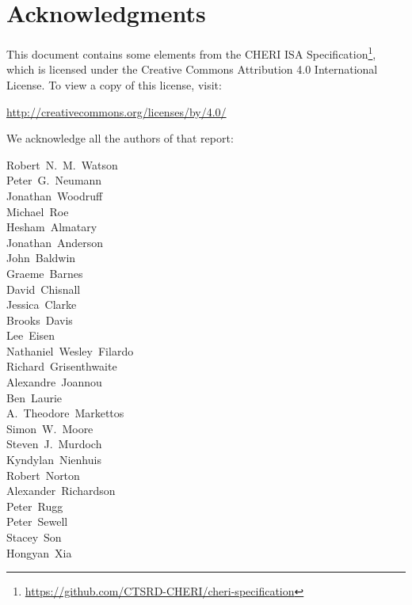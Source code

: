 \section*{Acknowledgments}

\vspace{-0.2cm}

\noindent
This document contains some elements from the CHERI ISA Specification\footnote{\url{https://github.com/CTSRD-CHERI/cheri-specification}},
which is licensed under the Creative Commons Attribution 4.0 International License. 
To view a copy of this license, visit:

\medskip

\url{http://creativecommons.org/licenses/by/4.0/}

\medskip
\noindent
We acknowledge all the authors of that report:

\medskip
\begin{small}
\noindent\begin{autogrid}{4}
Robert~N.~M.~Watson \\
Peter~G.~Neumann \\
Jonathan~Woodruff \\
Michael~Roe \\
Hesham~Almatary \\
Jonathan~Anderson \\
John~Baldwin \\
Graeme~Barnes \\
David~Chisnall \\
Jessica~Clarke \\
Brooks~Davis \\
Lee~Eisen \\
Nathaniel~Wesley~Filardo \\
Richard~Grisenthwaite \\
Alexandre~Joannou \\
Ben~Laurie \\
A.~Theodore~Markettos \\
Simon~W.~Moore \\
Steven~J.~Murdoch \\
Kyndylan~Nienhuis \\
Robert~Norton \\
Alexander~Richardson \\
Peter~Rugg \\
Peter~Sewell \\
Stacey~Son \\
Hongyan~Xia
\end{autogrid}
\end{small}

